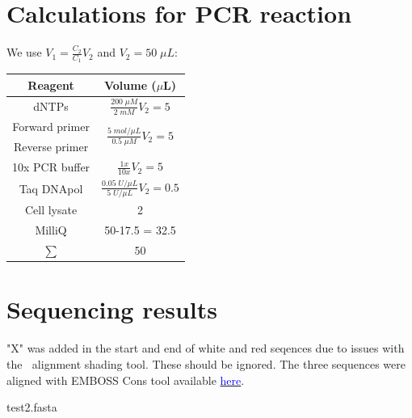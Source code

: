 \documentclass[11pt,a4paper]{article}
\begin{document}
 \section{Calculations for PCR reaction}
 We use $V_1=\frac{C_2}{C_1}V_2$ and $V_2=50 \; \mu L$:
  \begin{table}[H]
\begin{center}
 \begin{tabular} {c|c}
Reagent & Volume ($\mu$L)\\
\hline
 dNTPs & $\frac{200 \; \mu M}{2\;mM}V_2=5 $ \\  
 Forward primer & \multirow{2}{*}{$\frac{5\;mol/\mu L}{0.5\; \mu M}V_2=5$} \\
 Reverse primer & \\
 10x PCR buffer & $\frac{1x}{10x}V_2=5$ \\
 Taq DNApol & $\frac{0.05\;U/\mu L}{5\;U/\mu L}V_2=0.5$ \\
 Cell lysate & 2 \\
 MilliQ & 50-17.5 = 32.5 \\
 \hline
 $\sum$ & 50
\end{tabular}
\end{center}
\end{table}

 \section{Sequencing results}
"X" was added in the start and end of white and red seqences due to issues with the \TeXshade $\:$ alignment shading tool. These should be ignored. The three sequences were aligned with EMBOSS Cons tool available \href{https://www.ebi.ac.uk/Tools/msa/emboss_cons/}{\textcolor{blue}{here}}. \\
\begin{texshade}{test2.fasta}


\hideconsensus
\end{texshade}
\end{document}
